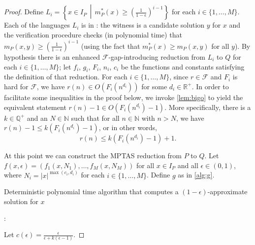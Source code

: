 \documentclass{article}
\DeclareMathOperator*{\argmax}{arg\,max}
\begin{document}
\begin{proof}
  Define $L_i = \left\{ x \in I_P \,\middle|\, m_P^*(x) \geq \left(\frac{1}{1 - \epsilon}\right)^{i - 1}\right\}$ for each $i \in \{1, \dotsc, M\}$.
  Each of the languages $L_i$ is in \NPO: the witness is a candidate solution $y$ for $x$ and the verification procedure checks (in polynomial time) that $m_P(x, y) \geq \left(\frac{1}{1 - \epsilon}\right)^{i - 1}$ (using the fact that $m_P^*(x) \geq m_P(x, y)$ for all $y$).
  By hypothesis there is an enhanced $\mathcal{F}$-gap-introducing reduction from $L_i$ to $Q$ for each $i \in \{1, \dotsc, M\}$; let $f_i$, $g_i$, $F_i$, $n_i$, $c_i$ be the functions and constants satisfying the definition of that reduction.
  For each $i \in \{1, \dotsc, M\}$, since $r \in \mathcal{F}$ and $F_i$ is hard for $\mathcal{F}$, we have $r(n) \in O(F_i(n^{d_i}))$ for some $d_i \in \mathbb{R}^+$.
  In order to facilitate some inequalities in the proof below, we invoke \autoref{lem:bigo} to yield the equivalent statement $r(n) - 1 \in O(F_i(n^{d_i}) - 1)$.
  More specifically, there is a $k \in \mathbb{Q}^+$ and an $N \in \mathbb{N}$ such that for all $n \in \mathbb{N}$ with $n > N$, we have $r(n) - 1 \leq k(F_i(n^{d_i}) - 1)$, or in other words,
  \begin{equation}\label{eq:0}
    r(n) \leq k(F_i(n^{d_i}) - 1) + 1.
  \end{equation}
  
  At this point we can construct the MPTAS reduction from $P$ to $Q$.
  Let $f(x, \epsilon) = (f_1(x, N_1), \dotsc, f_M(x, N_M))$ for all $x \in I_P$ and all $\epsilon \in (0, 1)$, where $N_i = |x|^{\max(c_i, d_i)}$ for each $i \in \{1, \dotsc, M\}$.
  Define $g$ as in \autoref{alg:g}.
  \begin{algorithm}[t]
    \caption{Deterministic polynomial time algorithm that computes a $(1 - \epsilon)$-approximate solution for $x$ \label{alg:g}}
    \begin{algorithmic}
      \Statex{}
      :
          \Else
          \EndIf
        \EndFor
        \State{$z_j \gets \argmax_{z_i \in Z}\{m_P(x, z_i)\}$} \\
        \hspace{1.5em}
      \EndFunction
    \end{algorithmic}
  \end{algorithm}
  Let $c(\epsilon) = \frac{\epsilon}{\epsilon + k(\epsilon - 1)}$.


\end{proof}
\end{document}
